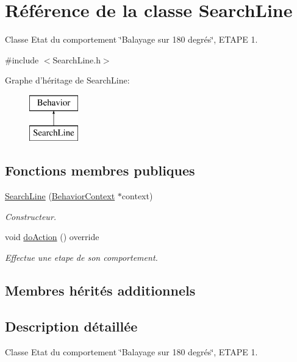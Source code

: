 \hypertarget{class_search_line}{\section{Référence de la classe Search\-Line}
\label{class_search_line}
}


Classe Etat du comportement \char`\"{}\-Balayage sur 180 degrés\char`\"{}, E\-T\-A\-P\-E 1.  




{\ttfamily \#include $<$Search\-Line.\-h$>$}

Graphe d'héritage de Search\-Line\-:\begin{figure}[H]
\begin{center}
\leavevmode
\includegraphics[height=2.000000cm]{class_search_line}
\end{center}
\end{figure}
\subsection*{Fonctions membres publiques}
{\bf }\par
\begin{DoxyCompactItemize}
\item 
\hyperlink{class_search_line_a13b4b02fb0fa0fa9639dc00b220ed3e3}{Search\-Line} (\hyperlink{class_behavior_context}{Behavior\-Context} $\ast$context)
\begin{DoxyCompactList}\small\item\em Constructeur. \end{DoxyCompactList}\item 
void \hyperlink{class_search_line_a628a67f749f14818dbe142ca54243019}{do\-Action} () override
\begin{DoxyCompactList}\small\item\em Effectue une etape de son comportement. \end{DoxyCompactList}\end{DoxyCompactItemize}

\subsection*{Membres hérités additionnels}


\subsection{Description détaillée}
Classe Etat du comportement \char`\"{}\-Balayage sur 180 degrés\char`\"{}, E\-T\-A\-P\-E 1. 

